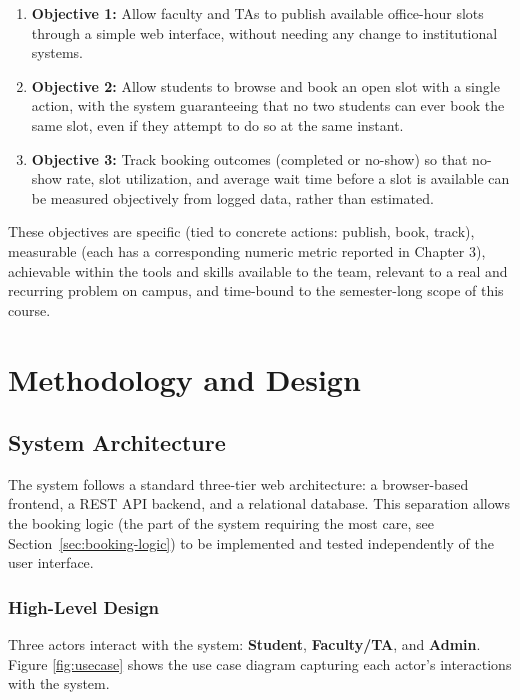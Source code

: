 \documentclass{tietreport}
\begin{document}
\begin{enumerate}
  \item \textbf{Objective 1:} Allow faculty and TAs to
    publish available office-hour slots through a simple
    web interface, without needing any change to
    institutional systems.
  \item \textbf{Objective 2:} Allow students to browse and
    book an open slot with a single action, with the
    system guaranteeing that no two students can ever book
    the same slot, even if they attempt to do so at the
    same instant.
  \item \textbf{Objective 3:} Track booking outcomes
    (completed or no-show) so that no-show rate, slot
    utilization, and average wait time before a slot is
    available can be measured objectively from logged
    data, rather than estimated.
\end{enumerate}

These objectives are specific (tied to concrete actions:
publish, book, track), measurable (each has a
corresponding numeric metric reported in Chapter 3),
achievable within the tools and skills available to the
team, relevant to a real and recurring problem on campus,
and time-bound to the semester-long scope of this course.


\chapter{Methodology and Design}

\section{System Architecture}

The system follows a standard three-tier web
architecture: a browser-based frontend, a REST API
backend, and a relational database. This separation
allows the booking logic (the part of the system requiring
the most care, see Section~\ref{sec:booking-logic}) to be
implemented and tested independently of the user
interface.

\subsection{High-Level Design}

Three actors interact with the system: \textbf{Student},
\textbf{Faculty/TA}, and \textbf{Admin}. Figure
\ref{fig:usecase} shows the use case diagram capturing
each actor's interactions with the system.
\end{document}
